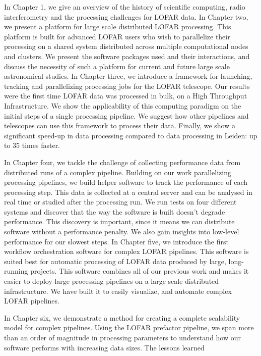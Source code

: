 In Chapter 1, we give an overview of the history of scientific computing, radio interferometry and the processing challenges for LOFAR data. In Chapter two, we present a platform for large scale distributed LOFAR processing. This platform is built for advanced LOFAR users who wish to parallelize their processing on a shared system distributed across multiple computational nodes and clusters. We present the software packages used and their interactions, and discuss the necessity of such a platform for current and future large scale astronomical studies. In Chapter three, we introduce a framework for launching, tracking and parallelizing processing jobs for the LOFAR telescope. Our results were the first time LOFAR data was processed in bulk, on a High Throughput Infrastructure. We show the applicability of this computing paradigm on the initial steps of a single processing pipeline. We suggest how other pipelines and telescopes can use this framework to process their data.  Finally, we show a significant speed-up in data processing compared to data processing in Leiden: up to 35 times faster. 

In Chapter four, we tackle the challenge of collecting performance data from distributed runs of a complex pipeline. Building on our work parallelizing processing pipelines, we build helper software to track the performance of each processing step. This data is collected at a central server and can be analysed in real time or studied after the processing run. We run tests on four different systems and discover that the way the software is built doesn't degrade performance. This discovery is important, since it means we can distribute software without a performance penalty. We also gain insights into low-level performance for our slowest steps.  In Chapter five, we introduce the first workflow orchestration software for complex LOFAR pipelines. This software is suited best for automatic processing of LOFAR data produced by large, long-running projects. This software combines all of our previous work and makes it easier to deploy large processing pipelines on a large scale distributed infrastructure. We have built it to easily visualize, and automate complex LOFAR pipelines.

In Chapter six, we demonstrate a method for creating a complete scalability model for complex pipelines. Using the LOFAR prefactor pipeline, we span more than an order of magnitude in processing parameters to understand how our software performs with increasing data sizes. The lessons learned 
